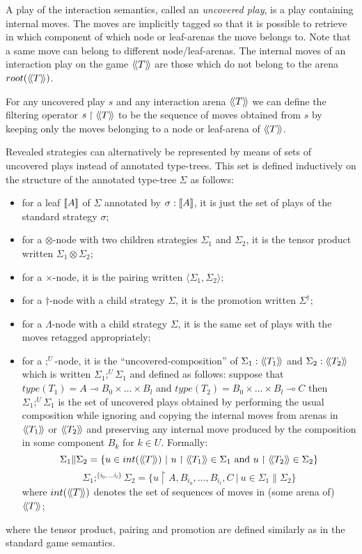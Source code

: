 A play of the interaction semantics, called an \emph{uncovered
play}, is a play containing internal moves.
The moves are implicitly tagged so that it is possible to retrieve in which component
of which node or leaf-arenas the move belongs to. Note that a same move can belong to different node/leaf-arenas.
The internal moves of an interaction play on the game ${\langle\!\langle T \rangle\!\rangle}$ are those which do not
belong to the arena $root({\langle\!\langle T \rangle\!\rangle})$.

For any uncovered play $s$ and any interaction arena ${\langle\!\langle T \rangle\!\rangle}$
we can define the filtering operator $s\upharpoonright {\langle\!\langle T \rangle\!\rangle}$ to be the
sequence of moves obtained from $s$ by keeping only the moves
belonging to a node or leaf-arena of ${\langle\!\langle T \rangle\!\rangle}$.


Revealed strategies can alternatively be represented by means of
sets of uncovered plays instead of annotated type-trees. This set is
defined inductively on the structure of the annotated type-tree
$\Sigma$ as follows:
\begin{itemize}
\item for a leaf ${[\![ A ]\!]}$ of $\Sigma$ annotated by $\sigma :{[\![ A ]\!]}$, it is just the set of plays of the standard strategy $\sigma$;
\item for a $\otimes$-node with two children strategies $\Sigma_1$ and $\Sigma_2$, it is the tensor product written $\Sigma_1 \otimes \Sigma_2$;
\item for a $\times$-node, it is the pairing written $\langle \Sigma_1, \Sigma_2 \rangle$;
\item for a $\dagger$-node with a child strategy $\Sigma$, it is the promotion written $\Sigma^\dagger$;
\item for a $\Lambda$-node with a child strategy $\Sigma$, it is the same set of plays with the moves retagged appropriately;

\item for a $;^U$-node, it is the ``uncovered-composition'' of $\Sigma_1 : {\langle\!\langle T_1 \rangle\!\rangle}$ and $\Sigma_2 :{\langle\!\langle T_2 \rangle\!\rangle}$ which is written $\Sigma_1
;^U \Sigma_1$ and defined as follows: suppose that $type(T_1) = A
\multimap B_0 \times \ldots \times B_l$ and $type(T_2) = B_0 \times
\ldots \times B_l \multimap C$ then $\Sigma_1 ;^U \Sigma_1$ is the
set of uncovered plays obtained by performing the usual composition
while ignoring and copying the internal moves from arenas in
${\langle\!\langle T_1 \rangle\!\rangle}$ or ${\langle\!\langle T_2 \rangle\!\rangle}$ and preserving any internal
move produced by the composition in some component $B_k$ for $k \in
U$. Formally:
$$ \Sigma_1 \| \Sigma_2 = \{ u \in int({\langle\!\langle T \rangle\!\rangle}) \ | \ u \upharpoonright {\langle\!\langle T_1 \rangle\!\rangle} \in \Sigma_1 \mbox{ and } u \upharpoonright {\langle\!\langle T_2 \rangle\!\rangle} \in \Sigma_2 \}$$
$$ \Sigma_1 ;^{\{i_0, \ldots i_l\}} \Sigma_2 = \{ u \upharpoonright A, B_{i_0}, \ldots, B_{i_l}, C \ | \ u \in \Sigma_1 \| \Sigma_2 \}$$
where $int({\langle\!\langle T \rangle\!\rangle})$ denotes the set of sequences of moves in (some arena of) ${\langle\!\langle T \rangle\!\rangle}$;
\end{itemize}
where the tensor product, pairing and promotion are defined similarly as in the standard game semantics.


